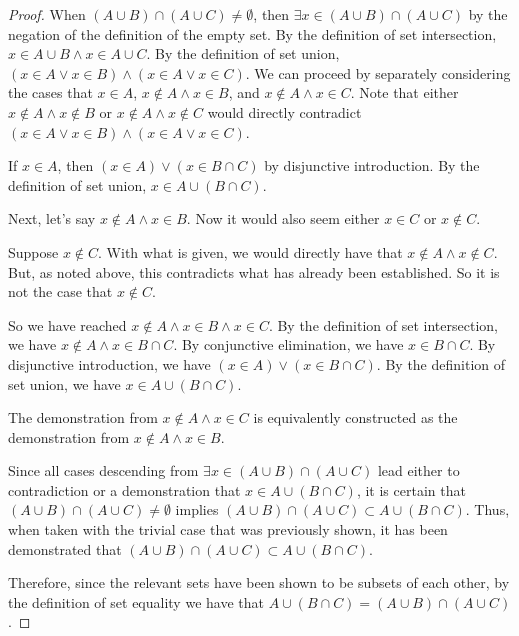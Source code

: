 \documentclass[main.tex]{subfiles}
\begin{document}
\begin{proof}
	When \((A \cup B) \cap (A \cup C) \neq \emptyset\), then
	\(\exists x \in (A \cup B) \cap (A \cup C)\) by the negation of the
	definition of the empty set. By the definition of set intersection,
	\(x \in A \cup B \land x \in A \cup C\). By the definition of set union,
	\((x \in A \lor x \in B) \land (x \in A \lor x \in C)\). We can proceed
	by separately considering the cases that \(x \in A\),
	\(x \notin A \land x \in B\), and \(x \notin A \land x \in C\). Note
	that either \(x \notin A \land x \notin B\) or
	\(x \notin A \land x \notin C\) would directly contradict
	\((x \in A \lor x \in B) \land (x \in A \lor x \in C)\).

	If \(x \in A\), then \((x \in A) \lor (x \in B \cap C)\) by disjunctive
	introduction. By the definition of set union,
	\(x \in A \cup (B \cap C)\).

	Next, let's say \(x \notin A \land x \in B\). Now it would also seem
	either \(x \in C\) or \(x \notin C\).

	Suppose \(x \notin C\). With what is given, we would directly have that
	\(x \notin A \land x \notin C\). But, as noted above, this contradicts
	what has already been established. So it is not the case that
	\(x \notin C\).

	So we have reached \(x \notin A \land x \in B \land x \in C\). By the
	definition of set intersection, we have
	\(x \notin A \land x \in B \cap C\). By conjunctive elimination, we have
	\(x \in B \cap C\). By disjunctive introduction, we have
	\((x \in A) \lor (x \in B \cap C)\). By the definition of set union, we
	have \(x \in A \cup (B \cap C)\).

	The demonstration from \(x \notin A \land x \in C\) is equivalently
	constructed as the demonstration from \(x \notin A \land x \in B\).

	Since all cases descending from
	\(\exists x \in (A \cup B) \cap (A \cup C)\) lead either to
	contradiction or a demonstration that \(x \in A \cup (B \cap C)\), it is
	certain that \((A \cup B) \cap (A \cup C) \neq \emptyset\) implies
	\((A \cup B) \cap (A \cup C) \subset A \cup (B \cap C)\). Thus, when
	taken with the trivial case that was previously shown, it has been
	demonstrated that
	\((A \cup B) \cap (A \cup C) \subset A \cup (B \cap C)\).

	\medskip
	Therefore, since the relevant sets have been shown to be subsets of each
	other, by the definition of set equality we have that
	\(A \cup (B \cap C) = (A \cup B) \cap (A \cup C)\).
\end{proof}
\end{document}
